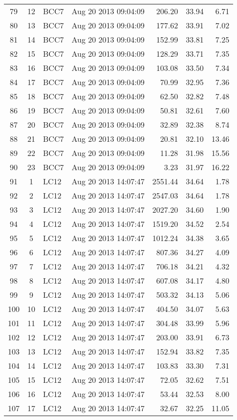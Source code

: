 \begin{longtable}{ccllrrr}
79&12&BCC7&Aug 20 2013 09:04:09&206.20&33.94&6.71\\
80&13&BCC7&Aug 20 2013 09:04:09&177.62&33.91&7.02\\
81&14&BCC7&Aug 20 2013 09:04:09&152.99&33.81&7.25\\
82&15&BCC7&Aug 20 2013 09:04:09&128.29&33.71&7.35\\
83&16&BCC7&Aug 20 2013 09:04:09&103.08&33.50&7.34\\
84&17&BCC7&Aug 20 2013 09:04:09&70.99&32.95&7.36\\
85&18&BCC7&Aug 20 2013 09:04:09&62.50&32.82&7.48\\
86&19&BCC7&Aug 20 2013 09:04:09&50.81&32.61&7.60\\
87&20&BCC7&Aug 20 2013 09:04:09&32.89&32.38&8.74\\
88&21&BCC7&Aug 20 2013 09:04:09&20.81&32.10&13.46\\
89&22&BCC7&Aug 20 2013 09:04:09&11.28&31.98&15.56\\
90&23&BCC7&Aug 20 2013 09:04:09&3.23&31.97&16.22\\
\hline 
91&1&LC12&Aug 20 2013 14:07:47&2551.44&34.64&1.78\\
92&2&LC12&Aug 20 2013 14:07:47&2547.03&34.64&1.78\\
93&3&LC12&Aug 20 2013 14:07:47&2027.20&34.60&1.90\\
94&4&LC12&Aug 20 2013 14:07:47&1519.20&34.52&2.54\\
95&5&LC12&Aug 20 2013 14:07:47&1012.24&34.38&3.65\\
96&6&LC12&Aug 20 2013 14:07:47&807.36&34.27&4.09\\
97&7&LC12&Aug 20 2013 14:07:47&706.18&34.21&4.32\\
98&8&LC12&Aug 20 2013 14:07:47&607.08&34.17&4.80\\
99&9&LC12&Aug 20 2013 14:07:47&503.32&34.13&5.06\\
100&10&LC12&Aug 20 2013 14:07:47&404.50&34.07&5.63\\
101&11&LC12&Aug 20 2013 14:07:47&304.48&33.99&5.96\\
102&12&LC12&Aug 20 2013 14:07:47&203.00&33.91&6.73\\
103&13&LC12&Aug 20 2013 14:07:47&152.94&33.82&7.35\\
104&14&LC12&Aug 20 2013 14:07:47&103.83&33.30&7.31\\
105&15&LC12&Aug 20 2013 14:07:47&72.05&32.62&7.51\\
106&16&LC12&Aug 20 2013 14:07:47&53.44&32.53&8.00\\
107&17&LC12&Aug 20 2013 14:07:47&32.67&32.25&11.05\\

\end{longtable}
